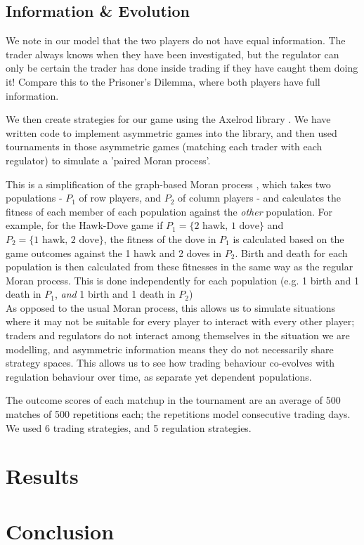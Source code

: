 \documentclass{article}
\begin{document}
\subsection{Information \& Evolution}
We note in our model that the two players do not have equal information. The trader always knows when they have been investigated, but the regulator can only be certain the trader has done inside trading if they have caught them doing it! Compare this to the Prisoner's Dilemma, where both players have full information.

We then create strategies for our game using the Axelrod library \citep{axelrodproject}. We have written code to implement asymmetric games into the library, and then used tournaments in those asymmetric games (matching each trader with each regulator) to simulate a 'paired Moran process'. 

This is a simplification of the graph-based Moran process \citep{shakarian2013novel}, which takes two populations - $P_1$ of row players, and $P_2$ of column players - and calculates the fitness of each member of each population against the \emph{other} population. For example, for the Hawk-Dove game if $P_1 = \{\text{2 hawk, 1 dove}\}$ and $P_2 = \{\text{1 hawk, 2 dove}\}$, the fitness of the dove in $P_1$ is calculated based on the game outcomes against the 1 hawk and 2 doves in $P_2$. Birth and death for each population is then calculated from these fitnesses in the same way as the regular Moran process. This is done independently for each population (e.g. 1 birth and 1 death in $P_1$, \emph{and} 1 birth and 1 death in $P_2$)
\\

As opposed to the usual Moran process, this allows us to simulate situations where it may not be suitable for every player to interact with every other player; traders and regulators do not interact among themselves in the situation we are modelling, and asymmetric information means they do not necessarily share strategy spaces. This allows us to see how trading behaviour co-evolves with regulation behaviour over time, as separate yet dependent populations.

The outcome scores of each matchup in the tournament are an average of 500 matches of 500 repetitions each; the repetitions model consecutive trading days. We used 6 trading strategies, and 5 regulation strategies.

\section{Results}

\section{Conclusion}


\end{document}
